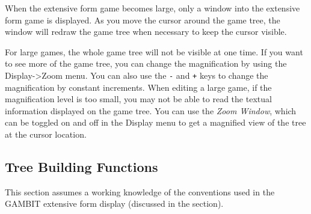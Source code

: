 When the extensive form 
game becomes large, only a window into the extensive form game is displayed.  
As you move the cursor around the game tree, the window will redraw 
the game tree when necessary to keep the cursor visible. 

For large games, the whole game tree will not be visible at one time.  If you 
want to see more of the game tree, you can change the magnification by 
using the Display->Zoom menu.  You can also use the \verb+-+ and 
\verb&+& keys to change the magnification by constant increments. When 
editing a large game, if the magnification level is too small, you may 
not be able to read the textual information displayed on the game tree.  You 
can use the {\em Zoom Window}, which can be toggled on and off in the Display 
menu to get a magnified view of the tree at the cursor location.  

\subsection{Tree Building Functions}
This section assumes a working knowledge of the conventions used in the
GAMBIT extensive form display (discussed in the 
 section).

